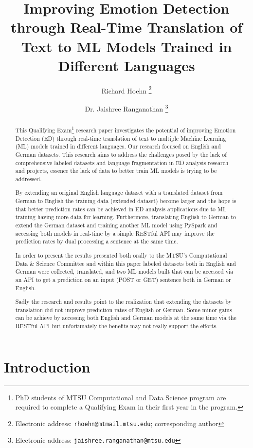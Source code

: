 \documentclass[11pt]{article}
\title{Improving Emotion Detection through Real-Time Translation of Text to ML Models Trained in Different Languages}
\author{Richard Hoehn%
	\thanks{Electronic address: \texttt{rhoehn@mtmail.mtsu.edu}; corresponding author}}
\affil{Middle Tennessee State University}
\author{Dr. Jaishree Ranganathan%
	\thanks{Electronic address: \texttt{jaishree.ranganathan@mtsu.edu}}}
\affil{Middle Tennessee State University}
\begin{document}
\maketitle

\begin{abstract}
This Qualifying Exam\footnote{PhD students of MTSU Computational and Data Science program are required to complete a Qualifying Exam in their first year in the program.} research paper investigates the potential of improving Emotion Detection (ED) through real-time translation of text to multiple Machine Learning (ML) models trained in different languages. Our research focused on  English and German datasets. This research aims to address the challenges posed by the lack of comprehensive labeled datasets and language fragmentation in ED analysis research and projects, essence the lack of data to better train ML models is trying to be addressed. 

By extending an original English language dataset with a translated dataset from German to English the training data (extended dataset) become larger and the hope is that better prediction rates can be achieved in ED analysis applications due to ML training having more data for learning. Furthermore, translating English to German to extend the German dataset and training another ML model using PySpark and accessing both models in real-time by a simple RESTful API may improve the prediction rates by dual processing a sentence at the same time.

In order to present the results presented both orally to the MTSU's Computational Data \& Science Committee and within this paper labeled datasets both in English and German were collected, translated, and two ML models built that can be accessed via an API to get a prediction on an input (POST or GET) sentence both in German or English.

Sadly the research and results point to the realization that extending the datasets by translation did not improve prediction rates of English or German. Some minor gains can be achieve by accessing both English and German models at the same time via the RESTful API but unfortunately the benefits may not really support the efforts.
\end{abstract}
\clearpage

\tableofcontents

\clearpage
\section{Introduction}
\end{document}
